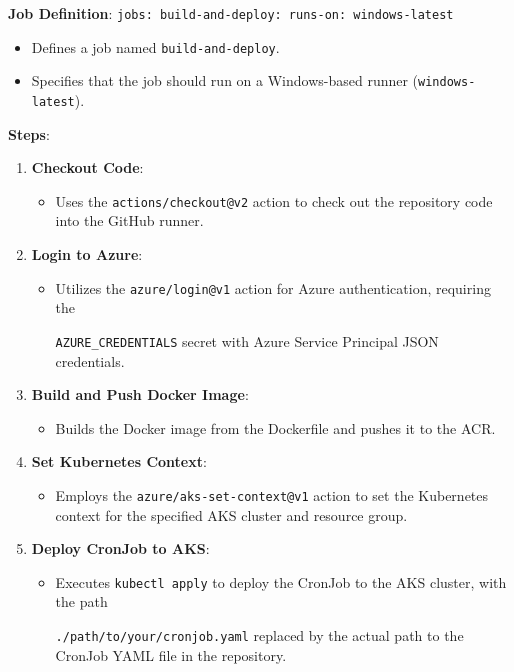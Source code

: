\documentclass{article}
\begin{document}
\textbf{Job Definition}: \texttt{jobs: build-and-deploy: runs-on: windows-latest}
\begin{itemize}
    \item Defines a job named \texttt{build-and-deploy}.
    \item Specifies that the job should run on a Windows-based runner (\texttt{windows-latest}).
\end{itemize}

\textbf{Steps}:
\begin{enumerate}
    \item \textbf{Checkout Code}: 
    \begin{itemize}
        \item Uses the \texttt{actions/checkout@v2} action to check out the repository code into the GitHub runner.
    \end{itemize}
    \item \textbf{Login to Azure}:
    \begin{itemize}
        \item Utilizes the \texttt{azure/login@v1} action for Azure authentication, requiring the
        
         \texttt{AZURE\_CREDENTIALS} secret with Azure Service Principal JSON credentials.
    \end{itemize}
    \item \textbf{Build and Push Docker Image}:
    \begin{itemize}
        \item Builds the Docker image from the Dockerfile and pushes it to the ACR.
    \end{itemize}
    \item \textbf{Set Kubernetes Context}:
    \begin{itemize}
        \item Employs the \texttt{azure/aks-set-context@v1} action to set the Kubernetes context for the specified AKS cluster and resource group.
    \end{itemize}
    \item \textbf{Deploy CronJob to AKS}:
    \begin{itemize}
        \item Executes \texttt{kubectl apply} to deploy the CronJob to the AKS cluster, with the path 

\texttt{./path/to/your/cronjob.yaml} replaced by the actual path to the CronJob YAML file in the repository.
    \end{itemize}
\end{enumerate}
\end{document}

